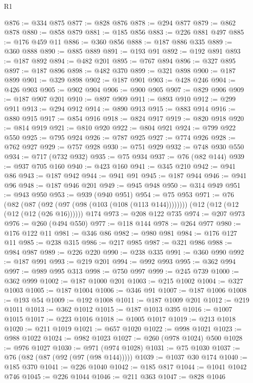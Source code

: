 \begin{lexlean}{R1}
\begin{coremodule}
@876 := @334 @875
@877 := @828 @876
@878 := @294 @877
@879 := @862 @878
@880 := @858 @879
@881 := @185 @856
@883 := @226 @881 @497
@885 := @176 @459 @11
@886 := @360 @856
@888 := @187 @886 @335
@889 := @360 @888
@890 := @885 @889
@891 := @193 @91
@892 := @192 @891
@893 := @187 @892
@894 := @482 @201
@895 := @767 @894
@896 := @327 @895
@897 := @187 @896
@898 := @482 @370
@899 := @321 @898
@900 := @187 @899
@901 := @329 @898
@902 := @187 @901
@903 := @428 @246
@904 := @426 @903
@905 := @902 @904
@906 := @900 @905
@907 := @829 @906
@909 := @187 @907 @201
@910 := @897 @909
@911 := @893 @910
@912 := @299 @911
@913 := @294 @912
@914 := @890 @913
@915 := @883 @914
@916 := @880 @915
@917 := @854 @916
@918 := @824 @917
@919 := @820 @918
@920 := @814 @919
@921 := @810 @920
@922 := @804 @921
@924 := @799 @922 @550
@925 := @795 @924
@926 := @787 @925
@927 := @774 @926
@928 := @762 @927
@929 := @757 @928
@930 := @751 @929
@932 := @748 @930 @550
@934 := @717 (@732 @932)
@935 := @75 @934
@937 := @76 (@82 @144)
@939 := @937 @705 @160
@940 := @423 @160
@941 := @345 @210
@942 := @941 @86
@943 := @187 @942
@944 := @941 @91
@945 := @187 @944
@946 := @941 @96
@948 := @187 @946 @201
@949 := @945 @948
@950 := @314 @949
@951 := @943 @950
@953 := @939 (@940 @951)
@954 := @75 @953
@971 := @76
    (@82 (@87 (@92 (@97 (@98 (@103 (@108 (@113 @144))))))))
    (@12 (@12 (@12 (@12 (@12 (@26 @16))))))
    @174
@973 := @208 @122 @735
@974 := @207 @973
@976 := @260 (@494 @550)
@977 := @118 @144
@978 := @264 @977
@980 := @176 @122 @11
@981 := @346 @86
@982 := @980 @981
@984 := @176 @127 @11
@985 := @238 @315
@986 := @217 @985
@987 := @321 @986
@988 := @984 @987
@989 := @226 @220
@990 := @238 @335
@991 := @360 @990
@992 := @187 @991
@993 := @219 @201
@994 := @992 @993
@995 := @362 @994
@997 := @989 @995 @313
@998 := @750 @997
@999 := @245 @739
@1000 := @362 @999
@1002 := @187 @1000 @201
@1003 := @215 @1002
@1004 := @327 @1003
@1005 := @187 @1004
@1006 := @346 @91
@1007 := @187 @1006
@1008 := @193 @54
@1009 := @192 @1008
@1011 := @187 @1009 @201
@1012 := @219 @1011
@1013 := @362 @1012
@1015 := @187 @1013 @395
@1016 := @1007 @1015
@1017 := @223 @1016
@1018 := @1005 @1017
@1019 := @213 @1018
@1020 := @211 @1019
@1021 := @657 @1020
@1022 := @998 @1021
@1023 := @988 @1022
@1024 := @982 @1023
@1027 := @260 (@978 @1024) @500
@1028 := @976 @1027
@1030 := @971 (@974 @1028)
@1031 := @75 @1030
@1037 := @76 (@82 (@87 (@92 (@97 (@98 @144)))))
@1039 := @1037 @30 @174
@1040 := @185 @370
@1041 := @226 @1040
@1042 := @185 @817
@1044 := @1041 @1042 @746
@1045 := @226 @1044
@1046 := @211 @363
@1047 := @828 @1046

\end{coremodule}
\end{lexlean}
